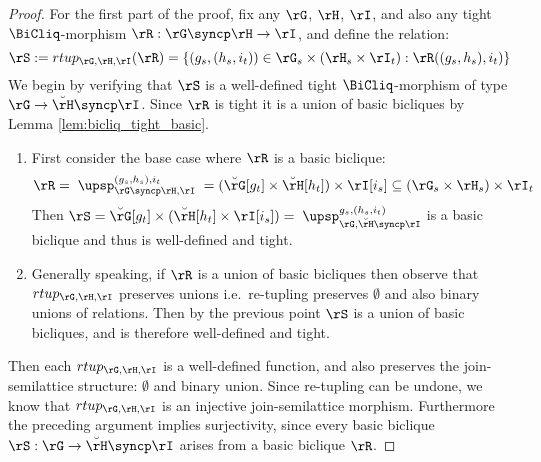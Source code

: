 \documentclass{article}
\begin{document}
\begin{proof}
For the first part of the proof, fix any $\rG$, $\rH$, $\rI$, and also any tight $\BiCliq$-morphism $\rR : \rG \syncp \rH \to \rI$, and define the relation:
\[
\rS := rtup_{\rG,\rH,\rI}(\rR) = \{ (g_s,(h_s,i_t)) \in \rG_s \times (\rH_s \times \rI_t) : \rR((g_s,h_s),i_t) \}
\]
We begin by verifying that $\rS$ is a well-defined tight $\BiCliq$-morphism of type $\rG \to \breve{\rH} \syncp \rI$. Since $\rR$ is tight it is a union of basic bicliques by Lemma \ref{lem:bicliq_tight_basic}.
\begin{enumerate}
\item
First consider the base case where $\rR$ is a basic biclique:
\[
\rR = \; \upsp_{\rG\syncp\rH,\rI}^{(g_s,h_s),i_t} \; = (\breve{\rG}[g_t] \times \breve{\rH}[h_t]) \times \rI[i_s]  \subseteq (\rG_s \times \rH_s) \times \rI_t
\]
Then $\rS = \breve{\rG}[g_t] \times (\breve{\rH}[h_t] \times \rI[i_s]) = \; \upsp_{\rG,\breve{\rH}\syncp\rI}^{g_s,(h_s,i_t)}$ is a basic biclique and thus is well-defined and tight.

\item
Generally speaking, if $\rR$ is a union of basic bicliques then observe that $rtup_{\rG,\rH,\rI}$ preserves unions i.e.\ re-tupling preserves $\emptyset$ and also binary unions of relations. Then by the previous point $\rS$ is a union of basic bicliques, and  is therefore well-defined and tight.
\end{enumerate}

Then each $rtup_{\rG,\rH,\rI}$ is a well-defined function, and also preserves the join-semilattice structure: $\emptyset$ and binary union. Since re-tupling can be undone, we know that $rtup_{\rG,\rH,\rI}$ is an injective join-semilattice morphism. Furthermore the preceding argument implies surjectivity, since every basic biclique $\rS : \rG \to \breve{\rH} \syncp \rI$ arises from a basic biclique $\rR$. 


\end{proof}
\end{document}
